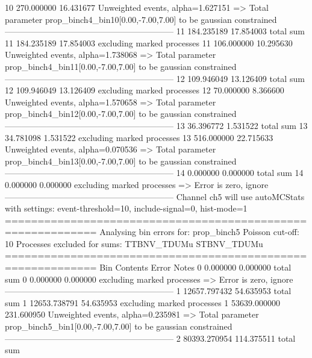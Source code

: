 10         270.000000      16.431677       Unweighted events, alpha=1.627151
  => Total parameter prop_binch4_bin10[0.00,-7.00,7.00] to be gaussian constrained
------------------------------------------------------------
11         184.235189      17.854003       total sum                     
11         184.235189      17.854003       excluding marked processes    
11         106.000000      10.295630       Unweighted events, alpha=1.738068
  => Total parameter prop_binch4_bin11[0.00,-7.00,7.00] to be gaussian constrained
------------------------------------------------------------
12         109.946049      13.126409       total sum                     
12         109.946049      13.126409       excluding marked processes    
12         70.000000       8.366600        Unweighted events, alpha=1.570658
  => Total parameter prop_binch4_bin12[0.00,-7.00,7.00] to be gaussian constrained
------------------------------------------------------------
13         36.396772       1.531522        total sum                     
13         34.781098       1.531522        excluding marked processes    
13         516.000000      22.715633       Unweighted events, alpha=0.070536
  => Total parameter prop_binch4_bin13[0.00,-7.00,7.00] to be gaussian constrained
------------------------------------------------------------
14         0.000000        0.000000        total sum                     
14         0.000000        0.000000        excluding marked processes    
  => Error is zero, ignore      
------------------------------------------------------------
Channel ch5 will use autoMCStats with settings: event-threshold=10, include-signal=0, hist-mode=1
============================================================
Analysing bin errors for: prop_binch5
Poisson cut-off: 10
Processes excluded for sums: TTBNV_TDUMu STBNV_TDUMu
============================================================
Bin        Contents        Error           Notes                         
0          0.000000        0.000000        total sum                     
0          0.000000        0.000000        excluding marked processes    
  => Error is zero, ignore      
------------------------------------------------------------
1          12657.797432    54.635953       total sum                     
1          12653.738791    54.635953       excluding marked processes    
1          53639.000000    231.600950      Unweighted events, alpha=0.235981
  => Total parameter prop_binch5_bin1[0.00,-7.00,7.00] to be gaussian constrained
------------------------------------------------------------
2          80393.270954    114.375511      total sum                     
